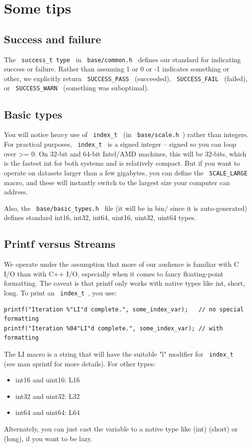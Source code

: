 \documentclass[letter]{report}
\begin{document}
\section{Some tips}

\subsection{Success and failure}

The \verb= success_t type = in \verb= base/common.h = defines our standard for indicating success or failure. Rather than assuming 1 or 0 or -1 indicates something or other, we explicitly return \verb= SUCCESS_PASS = (succeeded), \verb= SUCCESS_FAIL = (failed), or \verb= SUCCESS_WARN = (something was suboptimal).

\subsection{Basic types}

You will notice heavy use of \verb= index_t = (in \verb= base/scale.h =) rather than integers. For practical purposes, \verb= index_t = is a signed integer -- signed so you can loop over >= 0. On 32-bit and 64-bit Intel/AMD machines, this will be 32-bits, which is the fastest int for both systems and is relatively compact. But if you want to operate on datasets larger than a few gigabytes, you can define the \verb= SCALE_LARGE = macro, and these will instantly switch to the largest size your computer can address.

Also, the \verb= base/basic_types.h = file (it will be in bin/ since it is auto-generated) defines standard int16, int32, int64, uint16, uint32, uint64 types.

\subsection{Printf versus Streams}

We operate under the assumption that more of our audience is familiar with C I/O than with C++ I/O, especially when it comes to fancy floating-point formatting. The caveat is that printf only works with native types like int, short, long. To print an \verb= index_t =, you use:
\begin{verbatim}
printf("Iteration %"LI"d complete.", some_index_var);   // no special formatting
printf("Iteration %04"LI"d complete.", some_index_var); // with formatting
\end{verbatim}
The LI macro is a string that will have the suitable "l" modifier for \verb= index_t = (see man sprintf for more details). For other types:
\begin {itemize}
\item int16 and uint16: L16
\item int32 and uint32: L32
\item int64 and uint64: L64 
\end{itemize}
Alternately, you can just cast the variable to a native type like (int) (short) or (long), if you want to be lazy.
\end{document}
